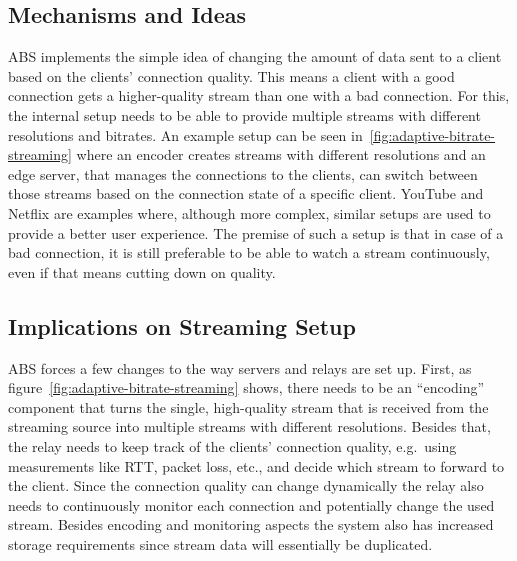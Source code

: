\subsection{Mechanisms and Ideas}
ABS implements the simple idea of changing the amount of data sent to a client 
based on the clients' connection quality.
This means a client with a good connection gets a higher-quality stream than 
one with a bad connection.
For this, the internal setup needs to be able to provide multiple streams with
different resolutions and bitrates.
An example setup can be seen in~\autoref{fig:adaptive-bitrate-streaming} where
an encoder creates streams with different resolutions and an edge server, that 
manages the connections to the clients, can switch between those streams based on
the connection state of a specific client.
YouTube and Netflix are examples where, although more complex, similar setups
are used to provide a better user experience.
The premise of such a setup is that in case of a bad connection, it is still 
preferable to be able to watch a stream continuously, even if that means
cutting down on quality.

\subsection{Implications on Streaming Setup}
ABS forces a few changes to the way servers and relays are set up.
First, as figure~\autoref{fig:adaptive-bitrate-streaming} shows, there needs to 
be an ``encoding'' component that turns the single, high-quality stream that is 
received from the streaming source into multiple streams with different resolutions.
Besides that, the relay needs to keep track of the clients' connection quality, e.g.~using 
measurements like RTT, packet loss, etc., and decide which stream to forward to the client.
Since the connection quality can change dynamically the relay also needs to continuously
monitor each connection and potentially change the used stream.
Besides encoding and monitoring aspects the system also has increased storage requirements
since stream data will essentially be duplicated.
